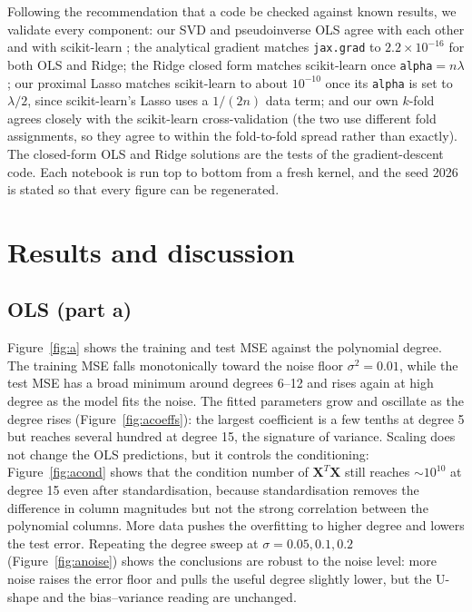 \documentclass[a4paper,11pt]{article}
\newcommand{\bX}{\boldsymbol{X}}
\begin{document}
Following the recommendation that a code be checked against known results, we
validate every component: our SVD and pseudoinverse OLS agree with each other
and with scikit-learn \cite{pedregosa2011}; the analytical gradient matches \texttt{jax.grad} to
$2.2\times10^{-16}$ for both OLS and Ridge; the Ridge closed form matches
scikit-learn once \texttt{alpha}$=n\lambda$; our proximal Lasso matches
scikit-learn to about $10^{-10}$ once its \texttt{alpha} is set to $\lambda/2$,
since scikit-learn's Lasso uses a $1/(2n)$ data term; and our own $k$-fold agrees
closely with the scikit-learn cross-validation (the two use different fold
assignments, so they agree to within the fold-to-fold spread rather than
exactly). The closed-form OLS and Ridge solutions are the
tests of the gradient-descent code. Each notebook is run top to bottom from a
fresh kernel, and the seed 2026 is stated so that every figure can be
regenerated.

\section{Results and discussion}
\label{sec:results}

\subsection{OLS (part a)}
Figure~\ref{fig:a} shows the training and test MSE against the polynomial
degree. The training MSE falls monotonically toward the noise floor
$\sigma^2=0.01$, while the test MSE has a broad minimum around degrees 6--12 and
rises again at high degree as the model fits the noise. The fitted parameters
grow and oscillate as the degree rises (Figure~\ref{fig:acoeffs}): the largest
coefficient is a few tenths at degree 5 but reaches several hundred at degree 15,
the signature of variance. Scaling does not change the
OLS predictions, but it controls the conditioning: Figure~\ref{fig:acond} shows
that the condition number of $\bX^T\bX$ still reaches $\sim 10^{10}$ at degree 15
even after standardisation, because standardisation removes the difference in
column magnitudes but not the strong correlation between the polynomial columns.
More data pushes the overfitting to higher degree and lowers the test error.
Repeating the degree sweep at $\sigma=0.05,0.1,0.2$ (Figure~\ref{fig:anoise})
shows the conclusions are robust to the noise level: more noise raises the error
floor and pulls the useful degree slightly lower, but the U-shape and the
bias--variance reading are unchanged.
\end{document}
